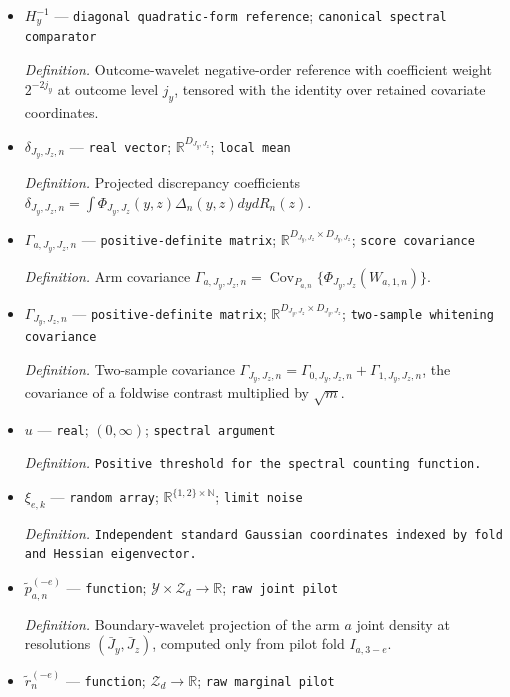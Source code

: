 \documentclass{article}
\begin{document}
\begin{itemize}
  \item \(H_y^{-1}\) --- \texttt{diagonal quadratic-\allowbreak{}form reference}; \texttt{canonical spectral comparator}
  \par\smallskip\noindent\emph{Definition.} Outcome-wavelet negative-order reference with coefficient weight \(2^{-2j_y}\) at outcome level \(j_y\), tensored with the identity over retained covariate coordinates.
  \item \(\delta_{J_y,J_z,n}\) --- \texttt{real vector}; \(\mathbb R^{D_{J_y,J_z}}\); \texttt{local mean}
  \par\smallskip\noindent\emph{Definition.} Projected discrepancy coefficients \(\delta_{J_y,J_z,n}=\int\Phi_{J_y,J_z}(y,z)\Delta_n(y,z)dydR_n(z)\).
  \item \(\Gamma_{a,J_y,J_z,n}\) --- \texttt{positive-\allowbreak{}definite matrix}; \(\mathbb R^{D_{J_y,J_z}\times D_{J_y,J_z}}\); \texttt{score covariance}
  \par\smallskip\noindent\emph{Definition.} Arm covariance \(\Gamma_{a,J_y,J_z,n}=\operatorname{Cov}_{P_{a,n}}\{\Phi_{J_y,J_z}(W_{a,1,n})\}\).
  \item \(\Gamma_{J_y,J_z,n}\) --- \texttt{positive-\allowbreak{}definite matrix}; \(\mathbb R^{D_{J_y,J_z}\times D_{J_y,J_z}}\); \texttt{two-\allowbreak{}sample whitening covariance}
  \par\smallskip\noindent\emph{Definition.} Two-sample covariance \(\Gamma_{J_y,J_z,n}=\Gamma_{0,J_y,J_z,n}+\Gamma_{1,J_y,J_z,n}\), the covariance of a foldwise contrast multiplied by \(\sqrt m\).
  \item \(u\) --- \texttt{real}; \((0,\infty)\); \texttt{spectral argument}
  \par\smallskip\noindent\emph{Definition.} \texttt{Positive threshold for the spectral counting function.}
  \item \(\xi_{e,k}\) --- \texttt{random array}; \(\mathbb R^{\{1,2\}\times\mathbb N}\); \texttt{limit noise}
  \par\smallskip\noindent\emph{Definition.} \texttt{Independent standard Gaussian coordinates indexed by fold and Hessian eigenvector.}
  \item \(\widetilde p_{a,n}^{(-e)}\) --- \texttt{function}; \(\mathcal Y\times\mathcal Z_d\to\mathbb R\); \texttt{raw joint pilot}
  \par\smallskip\noindent\emph{Definition.} Boundary-wavelet projection of the arm \(a\) joint density at resolutions \((\bar J_y,\bar J_z)\), computed only from pilot fold \(I_{a,3-e}\).
  \item \(\widetilde r_n^{(-e)}\) --- \texttt{function}; \(\mathcal Z_d\to\mathbb R\); \texttt{raw marginal pilot}

\end{itemize}
\end{document}
